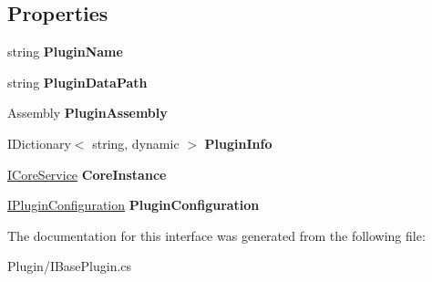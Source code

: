 \subsection*{Properties}
\begin{DoxyCompactItemize}
\item 
\hypertarget{interface_snowflake_1_1_plugin_1_1_i_base_plugin_a3d9484a7b0baeb1ad2b96166abc6e86c}{}string {\bfseries Plugin\+Name}\label{interface_snowflake_1_1_plugin_1_1_i_base_plugin_a3d9484a7b0baeb1ad2b96166abc6e86c}

\item 
\hypertarget{interface_snowflake_1_1_plugin_1_1_i_base_plugin_acffa36d28a9af2e65b9d78ee57990627}{}string {\bfseries Plugin\+Data\+Path}\label{interface_snowflake_1_1_plugin_1_1_i_base_plugin_acffa36d28a9af2e65b9d78ee57990627}

\item 
\hypertarget{interface_snowflake_1_1_plugin_1_1_i_base_plugin_a90fe77196a24fd7dd23b5152daa51828}{}Assembly {\bfseries Plugin\+Assembly}\label{interface_snowflake_1_1_plugin_1_1_i_base_plugin_a90fe77196a24fd7dd23b5152daa51828}

\item 
\hypertarget{interface_snowflake_1_1_plugin_1_1_i_base_plugin_a6dc8aa0f3d77a06c74b2dfd264a75d5a}{}I\+Dictionary$<$ string, dynamic $>$ {\bfseries Plugin\+Info}\label{interface_snowflake_1_1_plugin_1_1_i_base_plugin_a6dc8aa0f3d77a06c74b2dfd264a75d5a}

\item 
\hypertarget{interface_snowflake_1_1_plugin_1_1_i_base_plugin_a6c5e085010d15a35adb658de04687e1e}{}\hyperlink{interface_snowflake_1_1_service_1_1_i_core_service}{I\+Core\+Service} {\bfseries Core\+Instance}\label{interface_snowflake_1_1_plugin_1_1_i_base_plugin_a6c5e085010d15a35adb658de04687e1e}

\item 
\hypertarget{interface_snowflake_1_1_plugin_1_1_i_base_plugin_a0283c17215e70b5de7f9d940c666a0b7}{}\hyperlink{interface_snowflake_1_1_plugin_1_1_i_plugin_configuration}{I\+Plugin\+Configuration} {\bfseries Plugin\+Configuration}\label{interface_snowflake_1_1_plugin_1_1_i_base_plugin_a0283c17215e70b5de7f9d940c666a0b7}

\end{DoxyCompactItemize}


The documentation for this interface was generated from the following file\+:\begin{DoxyCompactItemize}
\item 
Plugin/I\+Base\+Plugin.\+cs\end{DoxyCompactItemize}
